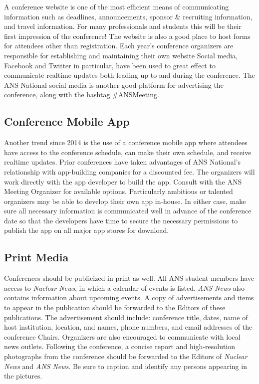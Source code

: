 \documentclass[12pt]{article}
\begin{document}
A conference website is one of the most efficient means of communicating information such as deadlines, announcements, sponsor \& recruiting information, and travel information.
For many professionals and students this will be their first impression of the conference!
The website is also a good place to host forms for attendees other than registration.
Each year's conference organizers are responsible for establishing and maintaining their own website
Social media, Facebook and Twitter in particular, have been used to great effect to communicate realtime updates both leading up to and during the conference.
The ANS National social media is another good platform for advertising the conference, along with the hashtag \#ANSMeeting.

\subsection{Conference Mobile App}
Another trend since 2014 is the use of a conference mobile app where attendees have access to the conference schedule, can make their own schedule, and receive realtime updates.
Prior conferences have taken advantages of ANS National's relationship with app-building companies for a discounted fee.
The organizers will work directly with the app developer to build the app.
Consult with the ANS Meeting Organizer for available options.
Particularly ambitious or talented organizers may be able to develop their own app in-house.
In either case, make sure all necessary information is communicated well in advance of the conference date so that the developers have time to secure the necessary permissions to publish the app on all major app stores for download.

\subsection{Print Media}
Conferences should be publicized in print as well.
All ANS student members have access to \textit{Nuclear News}, in which a calendar of events is listed.
\textit{ANS News} also contains information about upcoming events.
A copy of advertisements and items to appear in the publication should be forwarded to the Editors of these publications.
The advertisement should include: conference title, dates, name of host institution, location, and names, phone numbers, and email addresses of the conference Chairs.
Organizers are also encouraged to communicate with local news outlets.
Following the conference, a concise report and high-resolution photographs from the conference should be forwarded to the Editors of \textit{Nuclear News} and \textit{ANS News}.
Be sure to caption and identify any persons appearing in the pictures.
\end{document}
